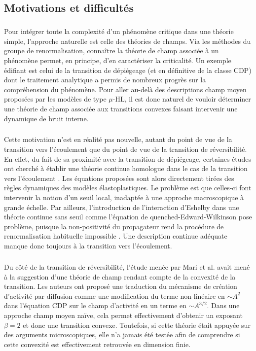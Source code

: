 \label{sec:eqchampconvexe}

\label{sec:eqChampConv}

\subsection{Motivations et difficultés}

\subparagraph{}Pour intégrer toute la complexité d'un phénomène critique dans une théorie simple, l'approche naturelle est celle des théories de champs. Via les méthodes du groupe de renormalisation, connaître la théorie de champ associée à un phénomène permet, en principe, d'en caractériser la criticalité. Un exemple édifiant est celui de la transition de dépiégeage (et en définitive de la classe CDP) dont le traitement analytique a permis de nombreux progrès sur la compréhension du phénomène. Pour aller au-delà des descriptions champ moyen proposées par les modèles de type $\mu$-HL, il est donc naturel de vouloir déterminer une théorie de champ associée aux transitions convexes faisant intervenir une dynamique de bruit interne.

\subparagraph{}Cette motivation n'est en réalité pas nouvelle, autant du point de vue de la transition vers l'écoulement que du point de vue de la transition de réversibilité. En effet, du fait de sa proximité avec la transition de dépiégeage, certaines études ont cherché à établir une théorie continue homologue dans le cas de la transition vers l'écoulement \cite{tyukodi_depinning_2016, weiss_finite_2014}. Les équations proposées sont alors directement tirées des règles dynamiques des modèles élastoplastiques. Le problème est que celles-ci font intervenir la notion d'un seuil local, inadaptée à une approche macroscopique à grande échelle. Par ailleurs, l'introduction de l'interaction d'Eshelby dans une théorie continue sans seuil comme l'équation de quenched-Edward-Wilkinson pose problème, puisque la non-positivité du propagateur rend la procédure de renormalisation habituelle impossible \cite{wiese_blabla}. Une description continue adéquate manque donc toujours à la transition vers l'écoulement.

\subparagraph{}Du côté de la transition de réversibilité, l'étude menée par Mari et al. \cite{mari_absorbing_2022} avait mené à la suggestion d'une théorie de champ rendant compte de la convexité de la transition. Les auteurs ont proposé une traduction du mécanisme de création d'activité par diffusion comme une modification du terme non-linéaire en $\sim A^2$ dans l'équation CDP sur le champ d'activité en un terme en $\sim A^{3/2}$. Dans une approche champ moyen naïve, cela permet effectivement d'obtenir un exposant $\beta = 2$ et donc une transition convexe. Toutefois, si cette théorie était appuyée sur des arguments microscopiques, elle n'a jamais été testée afin de comprendre si cette convexité est effectivement retrouvée en dimension finie.


